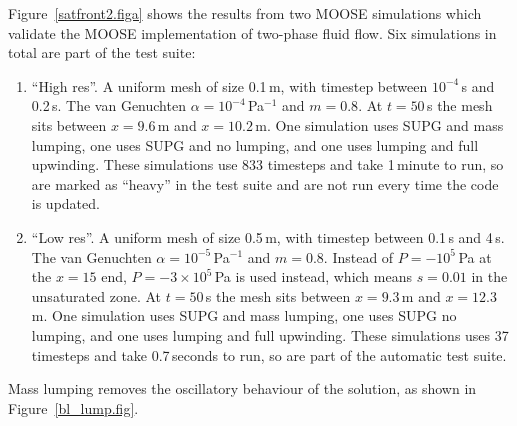 \documentclass[]{scrreprt}
\begin{document}
Figure~\ref{satfront2.figa} shows the results from two MOOSE
simulations which validate the MOOSE implementation of two-phase fluid
flow.  Six simulations in total are part of the test suite:
\begin{enumerate}
\item ``High res''.  A uniform mesh of size 0.1\,m, with timestep between
  $10^{-4}$\,s and 0.2\,s.  The van Genuchten
  $\alpha=10^{-4}$\,Pa$^{-1}$ and $m=0.8$.  At $t=50$\,s the mesh sits
  between $x=9.6$\,m and $x=10.2$\,m.  One simulation uses SUPG and mass
  lumping, one uses SUPG and no lumping, and one uses lumping and full upwinding.  These simulations use 833
  timesteps and take 1\,minute
  to run, so are marked as ``heavy'' in the test suite and are not run
  every time the code is updated.
\item ``Low res''.  A uniform mesh of size 0.5\,m, with timestep between 0.1\,s and
  4\,s.  The van Genuchten 
  $\alpha=10^{-5}$\,Pa$^{-1}$ and $m=0.8$.  Instead of $P=-10^{5}$\,Pa
  at the $x=15$ end, $P=-3\times 10^{5}$\,Pa is used instead, which
  means $s=0.01$ in the unsaturated zone.  At $t=50$\,s the mesh sits
  between $x=9.3$\,m and $x=12.3$\,m.  One simulation uses SUPG and mass
  lumping, one uses SUPG no lumping, and one uses lumping and full upwinding.  These simulations uses 37
  timesteps and take 0.7\,seconds to run, so are part of the automatic
  test suite.
\end{enumerate}
Mass lumping removes the oscillatory behaviour of the solution, as
shown in Figure~\ref{bl_lump.fig}.
\end{document}
